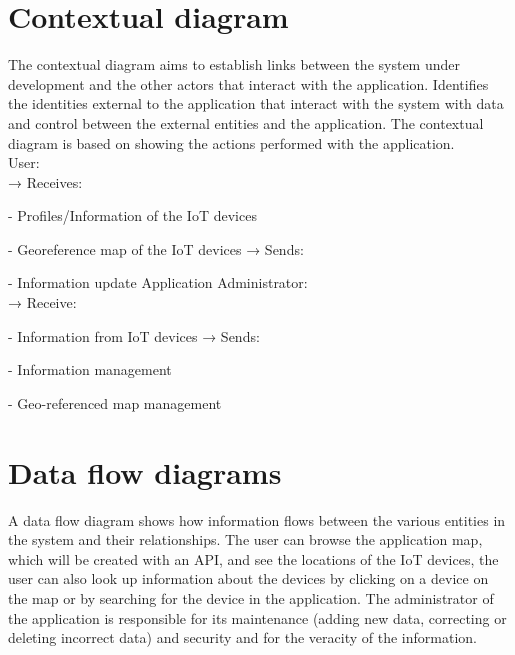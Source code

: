 \documentclass{scrreprt}
\begin{document}
\section{Contextual diagram}

The contextual diagram aims to establish links between the system under
development and the other actors that interact with the application.
\newline
Identifies the identities external to the application that interact with
the system with data and control between the external entities and the application.
The contextual diagram is based on showing the actions performed with the
application. \\
\newline
User: \\
\newline
→ Receives:

- Profiles/Information of the IoT devices

- Georeference map of the IoT devices
\newline
→ Sends:

- Information update \newline
\newline
Application Administrator: \\
\newline
→ Receive:

- Information from IoT devices
\newline
→ Sends:

- Information management

- Geo-referenced map management

\section{Data flow diagrams}

A data flow diagram shows how information flows between the various entities
in the system and their relationships.
The user can browse the application map, which will be created with an API,
and see the locations of the IoT devices, the user can also look up information
about the devices by clicking on a device on the map or by searching for
the device in the application. The administrator of the application is responsible for
its maintenance (adding new data, correcting or deleting incorrect data)
and security and for the veracity of the information.
\end{document}
